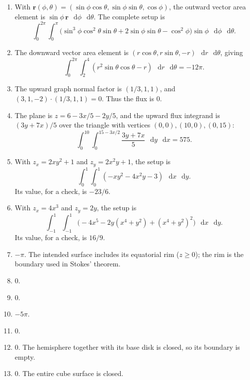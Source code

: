 \documentclass[11pt,letterpaper]{article}
\renewcommand{\vec}[1]{\mathbf{#1}}
\newcommand{\dd}{\mathop{}\!\mathrm{d}}
\begin{document}
\newpage
\begin{enumerate}[start=23]
\item With $\vec r(\phi,\theta)=(\sin\phi\cos\theta,
\sin\phi\sin\theta,\cos\phi)$, the outward vector area element is
$\sin\phi\,\vec r\,\dd\phi\,\dd\theta$. The complete setup is
\[
\boxed{\int_0^{2\pi}\int_0^\pi
\bigl(\sin^3\phi\cos^2\theta\sin\theta
+2\sin\phi\sin\theta-\cos^2\phi\bigr)
\sin\phi\,\dd\phi\,\dd\theta}.
\]

\item The downward vector area element is
$(r\cos\theta,r\sin\theta,-r)\,\dd r\,\dd\theta$, giving
\[
\int_0^{2\pi}\int_2^4(r^2\sin\theta\cos\theta-r)\,\dd r\,\dd\theta
=\boxed{-12\pi}.
\]

\item The upward graph normal factor is $(1/3,1,1)$, and
$(3,1,-2)\cdot(1/3,1,1)=0$. Thus the flux is $\boxed{0}$.

\item The plane is $z=6-3x/5-2y/5$, and the upward flux integrand is
$(3y+7x)/5$ over the triangle with vertices $(0,0),(10,0),(0,15)$:
\[
\int_0^{10}\int_0^{15-3x/2}\frac{3y+7x}{5}\,\dd y\,\dd x
=\boxed{575}.
\]

\item With $z_x=2xy^2+1$ and $z_y=2x^2y+1$, the setup is
\[
\boxed{\int_0^1\int_0^1(-xy^2-4x^2y-3)\,\dd x\,\dd y}.
\]
Its value, for a check, is $-23/6$.

\item With $z_x=4x^3$ and $z_y=2y$, the setup is
\[
\boxed{\int_{-1}^{1}\int_{-1}^{1}
\bigl(-4x^5-2y(x^4+y^2)+(x^4+y^2)^2\bigr)\,\dd x\,\dd y}.
\]
Its value, for a check, is $16/9$.

\item $\boxed{-\pi}$. The intended surface includes its equatorial rim
($z\ge0$); the rim is the boundary used in Stokes' theorem.
\item $\boxed{0}$.
\item $\boxed{0}$.
\item $\boxed{-5\pi}$.
\item $\boxed{0}$.
\item $\boxed{0}$. The hemisphere together with its base disk is closed,
so its boundary is empty.
\item $\boxed{0}$. The entire cube surface is closed.
\end{enumerate}
\end{document}
